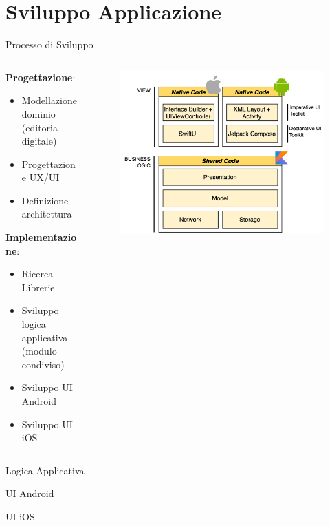 
\section{Sviluppo Applicazione}

\begin{frame}{Processo di Sviluppo}
    \begin{columns}[onlytextwidth]
        \begin{column}{0.4\textwidth}
            \textbf{Progettazione}:
            \begin{itemize}
                \item Modellazione dominio (editoria digitale)
                \item Progettazione UX/UI
                \item Definizione architettura
            \end{itemize}
            \vspace{3mm}
            \textbf{Implementazione}:
            \begin{itemize}
                \item Ricerca Librerie
                \item Sviluppo logica applicativa (modulo condiviso)
                \item Sviluppo UI Android
                \item Sviluppo UI iOS
            \end{itemize}
        \end{column}
        \begin{column}{0.6\textwidth}
             \begin{figure}[H]
                \includegraphics[width=1\textwidth]{img/stack_kmm.png}
            \end{figure}
        \end{column}
    \end{columns}
\end{frame}

\begin{frame}{Logica Applicativa}
    
\end{frame}

\begin{frame}{UI Android}
    
\end{frame}

\begin{frame}{UI iOS}
    
\end{frame}